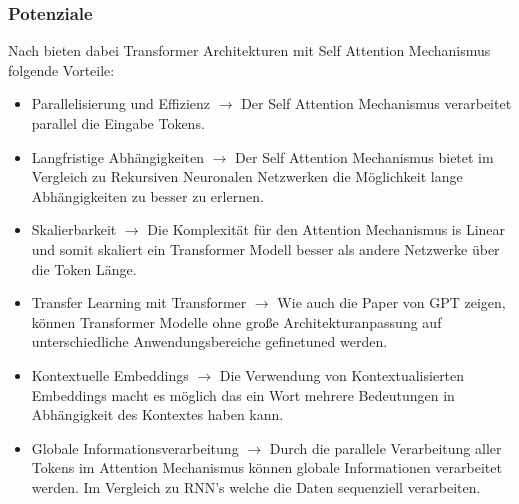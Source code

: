 \documentclass[conference]{IEEEtran}
\begin{document}
\subsubsection{Potenziale}
Nach \cite{kulkarniAppliedGenerativeAI2023} bieten dabei Transformer Architekturen mit Self Attention Mechanismus folgende Vorteile:
\begin{itemize}
    \item Parallelisierung und Effizienz $\rightarrow$ Der Self Attention Mechanismus verarbeitet parallel die Eingabe Tokens.
    \item Langfristige Abhängigkeiten $\rightarrow$ Der Self Attention Mechanismus bietet im Vergleich zu Rekursiven Neuronalen Netzwerken die Möglichkeit lange Abhängigkeiten zu besser zu erlernen.
    \item Skalierbarkeit $\rightarrow$ Die Komplexität für den Attention Mechanismus is Linear und somit skaliert ein Transformer Modell besser als andere Netzwerke über die Token Länge.
    \item Transfer Learning mit Transformer $\rightarrow$ Wie auch die Paper von GPT zeigen, können Transformer Modelle ohne große Architekturanpassung auf unterschiedliche Anwendungsbereiche gefinetuned werden.
    \item Kontextuelle Embeddings $\rightarrow$ Die Verwendung von Kontextualisierten Embeddings macht es möglich das ein Wort mehrere Bedeutungen in Abhängigkeit des Kontextes haben kann.
    \item Globale Informationsverarbeitung $\rightarrow$ Durch die parallele Verarbeitung aller Tokens im Attention Mechanismus können globale Informationen verarbeitet werden. Im Vergleich zu RNN's welche die Daten sequenziell verarbeiten.
\end{itemize}
\end{document}
